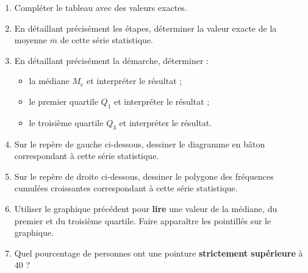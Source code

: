 \documentclass[10pt,french]{article}
\begin{document}
\begin{enumerate}
    \item Compléter le tableau avec des valeurs exactes.
    \item En détaillant précisément les étapes, déterminer la valeur exacte de la moyenne $\overline m$ de cette série statistique.
    \item En détaillant précisément la démarche, déterminer :
        \begin{itemize}
            \item la médiane $M_e$ et interpréter le résultat ;
            \item le premier quartile $Q_1$ et interpréter le résultat ;
            \item le troisième quartile $Q_3$ et interpréter le résultat.
        \end{itemize}
    \item Sur le repère de gauche ci-dessous, dessiner le diagramme en bâton correspondant à cette série statistique.
    \item Sur le repère de droite ci-dessous, dessiner le polygone des fréquences cumulées croissantes correspondant à cette série statistique.
    \item Utiliser le graphique précédent pour \textbf{lire} une valeur de la médiane, du premier et du troisième quartile. Faire apparaître les pointillés sur le graphique.
    \item Quel pourcentage de personnes ont une pointure \textbf{strictement supérieure} à $40$ ?
\end{enumerate}
\medskip

\begin{center}
\hfill
{}
\end{center}
\end{document}
